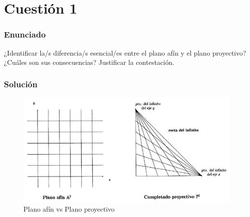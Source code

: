 \maketitle %

\newpage %

\tableofcontents %



\newpage




\section{Cuestión 1}

\subsubsection{Enunciado}

¿Identificar la/s diferencia/s esencial/es entre el plano afín y el plano proyectivo? ¿Cuáles son sus consecuencias? Justificar la contestación.

\subsubsection{Solución}

\begin{figure}[H]
\centering
\includegraphics[width=0.5\linewidth]{ppro}
\caption{Plano afín vs Plano proyectivo}
\label{fig:ppro}
\end{figure}

